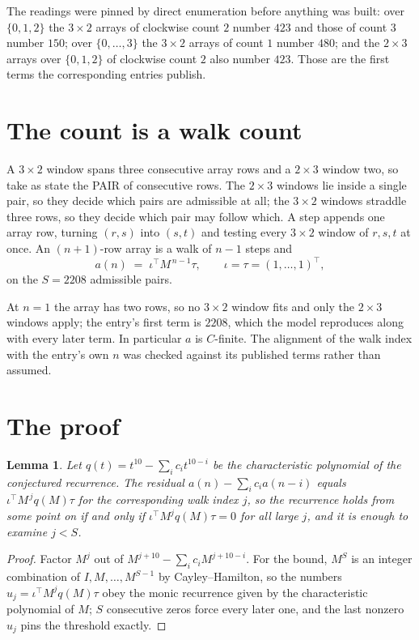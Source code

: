 \documentclass[11pt,a4paper]{article}
\theoremstyle{plain}
\newtheorem{lemma}[theorem]{Lemma}
\theoremstyle{definition}
\begin{document}
The readings were pinned by direct enumeration before anything was built: over
$\{0,1,2\}$ the $3\times2$ arrays of clockwise count $2$ number $423$ and those of count
$3$ number $150$; over $\{0,\dots,3\}$ the $3\times2$ arrays of count $1$ number $480$;
and the $2\times3$ arrays over $\{0,1,2\}$ of clockwise count $2$ also number $423$. Those
are the first terms the corresponding entries publish.

\section{The count is a walk count}

A $3\times2$ window spans three consecutive array rows and a $2\times3$
window two, so take as state the PAIR of consecutive rows. The $2\times3$ windows lie inside a
single pair, so they decide which pairs are admissible at all; the $3\times2$ windows straddle
three rows, so they decide which pair may follow which. A step appends one array row, turning
$(r,s)$ into $(s,t)$ and testing every $3\times2$ window of $r,s,t$ at once. An $(n+1)$-row
array is a walk of $n-1$ steps and
\[
a(n)\;=\;\iota^{\!\top}M^{\,n-1}\tau,\qquad\iota=\tau=(1,\dots,1)^{\!\top},
\]
on the $S=2208$ admissible pairs.

At $n=1$ the array has two rows, so no $3\times2$ window fits and only the
$2\times3$ windows apply; the entry's first term is
$2208$, which the model reproduces along with every later term.
In particular $a$ is $C$-finite. The alignment of the walk index with the entry's own $n$ was
checked against its published terms rather than assumed.

\section{The proof}

\begin{lemma}\label{lem:crit}
Let $q(t)=t^{10}-\sum_i c_it^{10-i}$ be the characteristic polynomial of the
conjectured recurrence. The residual $a(n)-\sum_ic_ia(n-i)$ equals
$\iota^{\!\top}M^{\,j}q(M)\tau$ for the corresponding walk index $j$, so the recurrence
holds from some point on if and only if $\iota^{\!\top}M^{j}q(M)\tau=0$ for all large $j$,
and it is enough to examine $j<S$.
\end{lemma}

\begin{proof}
Factor $M^{j}$ out of $M^{j+10}-\sum_ic_iM^{j+10-i}$. For the bound, $M^{S}$
is an integer combination of $I,M,\dots,M^{S-1}$ by Cayley--Hamilton, so the numbers
$u_j=\iota^{\!\top}M^{j}q(M)\tau$ obey the monic recurrence given by the characteristic
polynomial of $M$; $S$ consecutive zeros force every later one, and the last nonzero $u_j$
pins the threshold exactly.
\end{proof}
\end{document}
